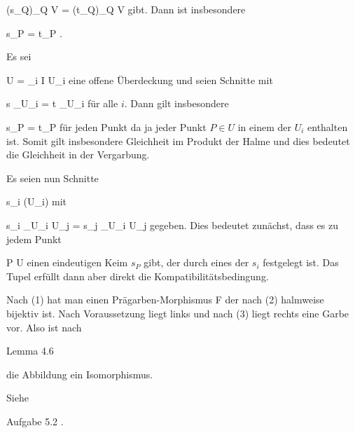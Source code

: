 {{\mavergleichskettedisp
{\vergleichskette
{ (s_Q)_{Q \in V}
}
{ =} { (t_Q)_{Q \in V}
}
{ } {
}
{ } {
}
{ } {
}
}
{}{}{}
gibt. Dann ist insbesondere

\mavergleichskette
{\vergleichskette
{ s_P
}
{ = }{ t_P
}
{  }{
}
{    }{
}
{   }{
}
}
{}{}{.}
}{Es sei

\mavergleichskettedisp
{\vergleichskette
{ U
}
{ =} { \bigcup_{i \in I} U_i
}
{ } {
}
{ } {
}
{ } {
}
}
{}{}{}
eine offene Überdeckung und seien
 Schnitte mit

\mavergleichskette
{\vergleichskette
{ s \vert_{U_i }
}
{ = }{ t \vert_{U_i }
}
{  }{
}
{    }{
}
{   }{
}
}
{}{}{}
für alle $i$. Dann gilt insbesondere

\mavergleichskettedisp
{\vergleichskette
{ s_P
}
{ =} { t_P
}
{ } {
}
{ } {
}
{ } {
}
}
{}{}{}
für jeden Punkt
 da ja jeder Punkt $P \in U$ in einem der $U_i$ enthalten ist. Somit gilt insbesondere Gleichheit im Produkt der Halme und dies bedeutet die Gleichheit in der Vergarbung.

Es seien nun Schnitte

\mavergleichskettedisp
{\vergleichskette
{s_i
}
{ \in} {  (U_i)
}
{ } {
}
{ } {
}
{ } {
}
}
{}{}{}
mit

\mavergleichskette
{\vergleichskette
{ { s_i } \vert_{U_i \cap U_j }
}
{ = }{ { s_j } \vert_{U_i \cap U_j }
}
{  }{
}
{    }{
}
{   }{
}
}
{}{}{}
gegeben. Dies bedeutet zunächst, dass es zu jedem Punkt

\mavergleichskette
{\vergleichskette
{P
}
{ \in }{ U
}
{  }{
}
{    }{
}
{   }{
}
}
{}{}{}
einen eindeutigen Keim $s_P$ gibt, der durch eines der $s_i$ festgelegt ist. Das Tupel
 erfüllt dann aber direkt die Kompatibilitätsbedingung.
}{Nach (1) hat man einen Prägarben-Morphismus
\maabbdisp {} { { \mathcal  F   } } { 
} {}
der nach (2) halmweise bijektiv ist. Nach Voraussetzung liegt links und nach (3) liegt rechts eine Garbe vor. Also ist nach

Lemma 4.6

die Abbildung ein Isomorphismus.
}{Siehe

Aufgabe 5.2
.
}




}








